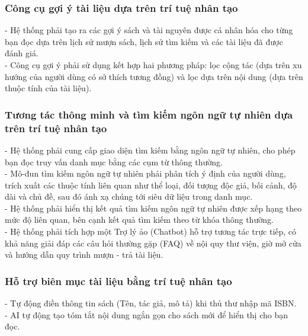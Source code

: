 \subsubsection{Công cụ gợi ý tài liệu dựa trên trí tuệ nhân tạo}
- Hệ thống phải tạo ra các gợi ý sách và tài nguyên được cá nhân hóa cho từng bạn đọc dựa trên lịch sử mượn sách, lịch sử tìm kiếm và các tài liệu đã được đánh giá.\\
- Công cụ gợi ý phải sử dụng kết hợp hai phương pháp: lọc cộng tác (dựa trên xu hướng của người dùng có sở thích tương đồng) và lọc dựa trên nội dung (dựa trên thuộc tính của tài liệu).\\

\subsubsection{Tương tác thông minh và tìm kiếm ngôn ngữ tự nhiên dựa trên trí tuệ nhân tạo}
- Hệ thống phải cung cấp giao diện tìm kiếm bằng ngôn ngữ tự nhiên, cho phép bạn đọc truy vấn danh mục bằng các cụm từ thông thường.\\
- Mô-đun tìm kiếm ngôn ngữ tự nhiên phải phân tích ý định của người dùng, trích xuất các thuộc tính liên quan như thể loại, đối tượng độc giả, bối cảnh, độ dài và chủ đề, sau đó ánh xạ chúng tới siêu dữ liệu trong danh mục.\\
- Hệ thống phải hiển thị kết quả tìm kiếm ngôn ngữ tự nhiên được xếp hạng theo mức độ liên quan, bên cạnh kết quả tìm kiếm theo từ khóa thông thường.\\
- Hệ thống phải tích hợp một Trợ lý ảo (Chatbot) hỗ trợ tương tác trực tiếp, có khả năng giải đáp các câu hỏi thường gặp (FAQ) về nội quy thư viện, giờ mở cửa và hướng dẫn quy trình mượn - trả tài liệu. \\

\subsubsection{Hỗ trợ biên mục tài liệu bằng trí tuệ nhân tạo}
- Tự động điền thông tin sách (Tên, tác giả, mô tả) khi thủ thư nhập mã ISBN. \\
- AI tự động tạo tóm tắt nội dung ngắn gọn cho sách mới để hiển thị cho bạn đọc. \\


